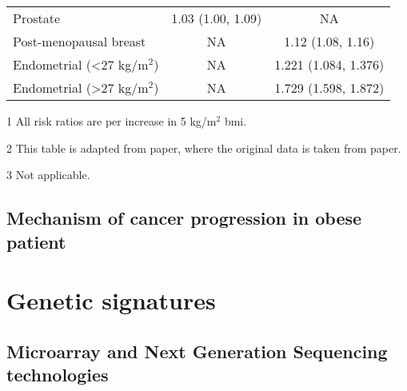 \begin{table}[h]
\begin{threeparttable}
\begin{tabular}{lcc}
			Prostate                                & 1.03 (1.00, 1.09) & NA\\
			Post-menopausal breast                  & NA                & 1.12 (1.08, 1.16)\\
			Endometrial (\textless{}27 kg/m$^2$)    & NA                & 1.221 (1.084, 1.376)\\
			Endometrial (\textgreater{}27 kg/m$^2$) & NA                & 1.729 (1.598, 1.872)\\
		\end{tabular}
		\begin{tablenotes}
			\begin{footnotesize}
				\item [1] All risk ratios are per increase in 5 kg/m$^2$ \gls{bmi}.
				\item [2] This table is adapted from \citet{Roberts2010} paper, where the original data is taken from \citet{Renehan2008} paper.
				\item [3] Not applicable.
			\end{footnotesize}
		\end{tablenotes}
	\end{threeparttable}
\end{table}

\subsection{Mechanism of cancer progression in obese patient}
\label{sub:mechanism_of_cancer_progression_in_obese_patient}











\section{Genetic signatures}
\label{sec:genetic_signatures}

\subsection{Microarray and Next Generation Sequencing technologies}
\label{sub:microarray_and_next_generation_sequencing_technologies}

